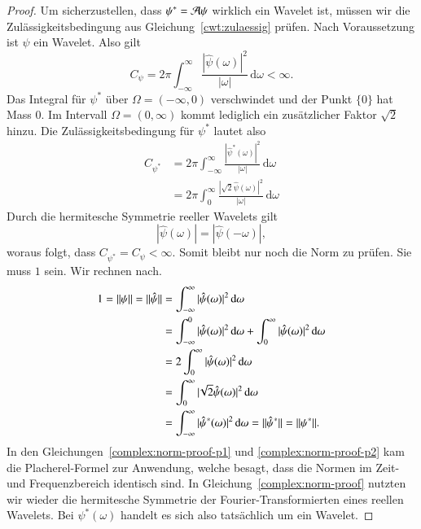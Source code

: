 \begin{proof}
	Um sicherzustellen, dass $\psi^\ast = \Ana\psi$ wirklich ein Wavelet ist, müssen wir die Zulässigkeitsbedingung aus Gleichung~\eqref{cwt:zulaessig} prüfen.
	Nach Voraussetzung ist $\psi$ ein Wavelet.
	Also gilt
	\[
	C_{\psi}
	=
	2\pi
	\int_{-\infty}^\infty \frac{|\hat{\psi}(\omega)|^2}{|\omega|}\,\mathrm{d}\omega < \infty.
	\]
	Das Integral für $\psi^\ast$ über $\Omega = (-\infty, 0)$ verschwindet und der Punkt $\lbrace 0 \rbrace$ hat Mass $0$.
	Im Intervall $\Omega = (0, \infty)$ kommt lediglich ein zusätzlicher Faktor $\sqrt 2$ hinzu.
	Die Zulässigkeitsbedingung für $\psi^\ast$ lautet also
	\begin{align*}
		C_{\psi^\ast}
		&= 2\pi	\int_{-\infty}^\infty \frac{|\hat{\psi}^\ast(\omega)|^2}{|\omega|}\,\mathrm{d}\omega \\
		&= 2\pi \int_{0}^\infty \frac{|\!\sqrt{2}\hat{\psi}(\omega)|^2}{|\omega|}\,\mathrm{d}\omega
	\end{align*}
	Durch die hermitesche Symmetrie reeller Wavelets gilt 
	\[|\hat\psi(\omega)| = |\hat\psi(-\omega)|,\]
	woraus folgt, dass $C_{\psi^\ast} = C_{\psi} < \infty.$
	Somit bleibt nur noch die Norm zu prüfen.
	Sie muss $1$ sein.
	Wir rechnen nach.
	\begin{align}
	1 = \|\psi\| = \|\hat{\psi}\| 
	&= \int_{-\infty}^{\infty}|\hat{\psi}(\omega)|^2 \,\mathrm{d}\omega \label{complex:norm-proof-p1}\\
	&= \int_{-\infty}^{0}|\hat{\psi}(\omega)|^2 \,\mathrm{d}\omega +  \int_{0}^{\infty}|\hat{\psi}(\omega)|^2 \,\mathrm{d}\omega \notag\\
	&=  2\int_{0}^{\infty} |\hat{\psi}(\omega)|^2 \,\mathrm{d}\omega \label{complex:norm-proof}\\
	&=  \int_{0}^{\infty}|\!\sqrt{2}\hat{\psi}(\omega)|^2 \,\mathrm{d}\omega \notag\\
	&=  \int_{-\infty}^{\infty}|\hat{\psi}^\ast(\omega)|^2 \,\mathrm{d}\omega 
	= \|\hat{\psi}^\ast\| = \|\psi^\ast\|.\label{complex:norm-proof-p2}
	\end{align}
	In den Gleichungen~\eqref{complex:norm-proof-p1} und \eqref{complex:norm-proof-p2} kam die Placherel-Formel zur Anwendung, welche besagt, dass die Normen im Zeit- und Frequenzbereich identisch sind.
	In Gleichung~\eqref{complex:norm-proof} nutzten wir wieder die hermitesche Symmetrie der Fourier-Transformierten eines reellen Wavelets.
	Bei $\psi^\ast(\omega)$ handelt es sich also tatsächlich um ein Wavelet.
\end{proof}


